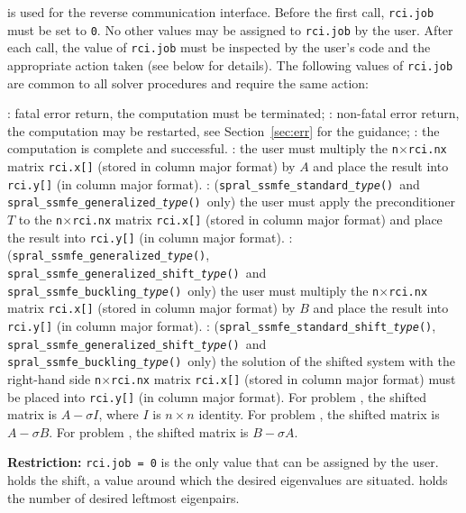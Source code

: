 \begin{description}
%
 is used for the reverse communication interface.
Before the first call, {\tt rci.job} must be set to {\tt 0}.
No other values may be assigned to {\tt rci.job} by the user.
After each call,
the value of {\tt rci.job} must be inspected by the user's code
and the appropriate action taken (see below for details).
The following values of {\tt rci.job}
are common to all solver procedures 
and require the same action: 
%
\begin{description}
%
: fatal error return, the computation must be terminated;
%
: 
non-fatal error return, the computation may be restarted,
see Section~\ref{sec:err} for the guidance;
%
: the computation is complete and successful.
%
: 
the user must multiply the {\tt n}$\times${\tt rci.nx} matrix
{\tt rci.x[]} (stored in column major format) by $A$ and place the result into {\tt rci.y[]} (in column major format).
%
: 
({\tt spral\_ssmfe\_standard\_\textit{type}()}\ and {\tt spral\_ssmfe\_generalized\_\textit{type}()}\ only)
the user must
apply the preconditioner $T$ to the {\tt n}$\times${\tt rci.nx} matrix
{\tt rci.x[]} (stored in column major format) and place the result into {\tt rci.y[]} (in column major format).
%
: 
({\tt spral\_ssmfe\_generalized\_\textit{type}()},
 {\tt spral\_ssmfe\_generalized\_shift\_\textit{type}()}\ and\\
 {\tt spral\_ssmfe\_buckling\_\textit{type}()}\ only)
the user must multiply the {\tt n}$\times${\tt rci.nx} matrix
{\tt rci.x[]} (stored in column major format) by $B$ and place the result into {\tt rci.y[]} (in column major format).
%
:
({\tt spral\_ssmfe\_standard\_shift\_\textit{type}()},
 {\tt spral\_ssmfe\_generalized\_shift\_\textit{type}()}\ and\\
 {\tt spral\_ssmfe\_buckling\_\textit{type}()}\ only)
the solution of the shifted system
with the right-hand side {\tt n}$\times${\tt rci.nx} matrix {\tt rci.x[]}
(stored in column major format) must be placed into {\tt rci.y[]} (in column major format).
For problem , the shifted matrix is $A - \sigma I$,
where $I$ is $n\times n$ identity.
For problem , the shifted matrix is $A - \sigma B$.
For problem , the shifted matrix is $B - \sigma A$.
%
\end{description}
%
{\bf Restriction:} 
{\tt rci.job = 0} is the only value that can be assigned by the user.
%
holds the shift, a value around which the desired eigenvalues are situated.
%
 holds the number of desired leftmost eigenpairs.

\end{description}
